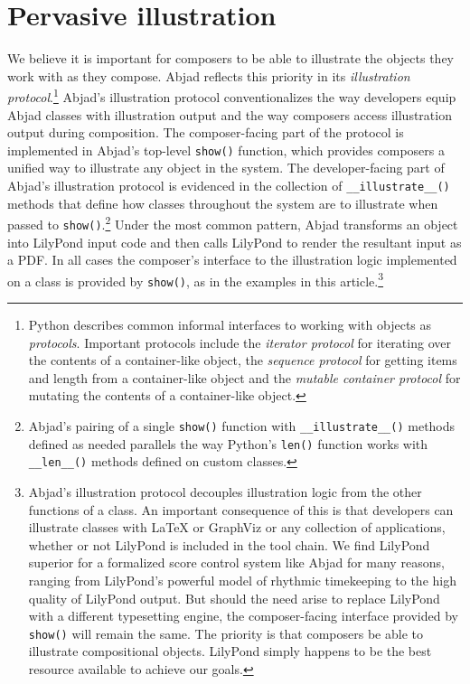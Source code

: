 \documentclass{article}
\begin{document}
\section{Pervasive illustration} \label{sec:illustration}

We believe it is important for composers to be able to illustrate the objects
they work with as they compose. Abjad reflects this priority in its
\emph{illustration protocol}.\footnote{Python describes common informal
interfaces to working with objects as \emph{protocols}. Important protocols
include the \emph{iterator protocol} for iterating over the contents of a
container-like object, the \emph{sequence protocol} for getting items and
length from a container-like object and the \emph{mutable container protocol}
for mutating the contents of a container-like object.} Abjad's illustration
protocol conventionalizes the way developers equip Abjad classes with
illustration output and the way composers access illustration output during
composition. The composer-facing part of the protocol is implemented in Abjad's
top-level \texttt{show()} function, which provides composers a unified way to
illustrate any object in the system. The developer-facing part of Abjad's
illustration protocol is evidenced in the collection of
\texttt{\_\_illustrate\_\_()} methods that define how classes throughout the
system are to illustrate when passed to \texttt{show()}.\footnote{Abjad's
pairing of a single \texttt{show()} function with \texttt{\_\_illustrate\_\_()}
methods defined as needed parallels the way Python's \texttt{len()} function
works with \texttt{\_\_len\_\_()} methods defined on custom classes.} Under the
most common pattern, Abjad transforms an object into LilyPond input code and
then calls LilyPond to render the resultant input as a PDF. In all cases the
composer's interface to the illustration logic implemented on a  class is
provided by \texttt{show()}, as in the examples in this
article.\footnote{Abjad's illustration protocol decouples illustration logic
from the other functions of a class. An important consequence of this is that
developers can illustrate classes with LaTeX or GraphViz or any collection of
applications, whether or not LilyPond is included in the tool chain. We find
LilyPond superior for a formalized score control system like Abjad for many
reasons, ranging from LilyPond's powerful model of rhythmic timekeeping to the
high quality of LilyPond output. But should the need arise to replace LilyPond
with a different typesetting engine, the composer-facing  interface provided by
\texttt{show()} will remain the same. The priority is that composers be able to
illustrate compositional objects. LilyPond simply happens to be the best
resource available to achieve our goals.} 
\end{document}
